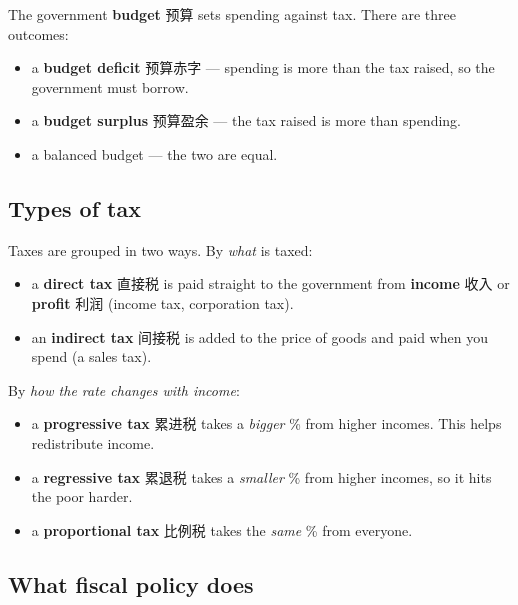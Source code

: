 \documentclass[11pt]{article}
\begin{document}
The government \textbf{budget} 预算 sets spending against tax. There are three outcomes:

\begin{itemize}
\item a \textbf{budget deficit} 预算赤字 — spending is more than the tax raised, so the government must borrow.

\item a \textbf{budget surplus} 预算盈余 — the tax raised is more than spending.

\item a balanced budget — the two are equal.

\end{itemize}

\subsection*{Types of tax}

Taxes are grouped in two ways. By \emph{what} is taxed:

\begin{itemize}
\item a \textbf{direct tax} 直接税 is paid straight to the government from \textbf{income} 收入 or \textbf{profit} 利润 (income tax, corporation tax).

\item an \textbf{indirect tax} 间接税 is added to the price of goods and paid when you spend (a sales tax).

\end{itemize}

By \emph{how the rate changes with income}:

\begin{itemize}
\item a \textbf{progressive tax} 累进税 takes a \emph{bigger} \% from higher incomes. This helps redistribute income.

\item a \textbf{regressive tax} 累退税 takes a \emph{smaller} \% from higher incomes, so it hits the poor harder.

\item a \textbf{proportional tax} 比例税 takes the \emph{same} \% from everyone.

\end{itemize}

\subsection*{What fiscal policy does}
\end{document}
